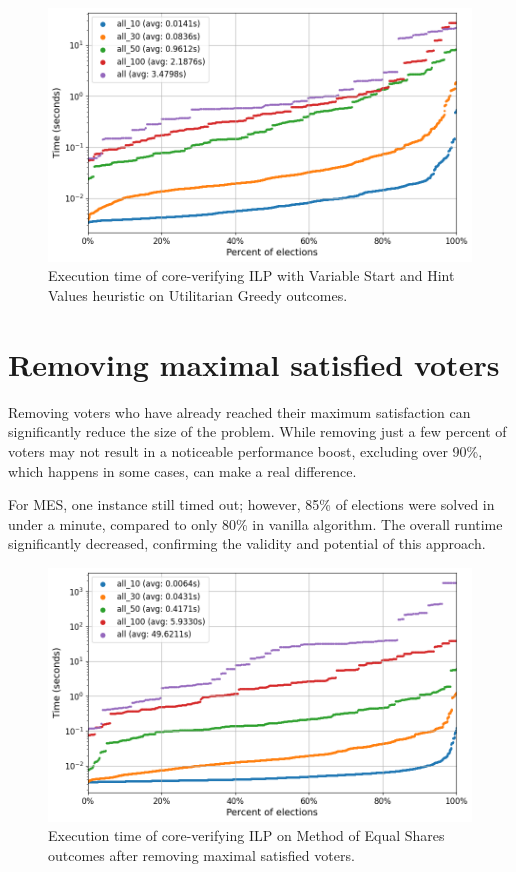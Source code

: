\documentclass[magisterska,en]{pracamgr}
\newcommand\chartsize{0.94}
\begin{document}
\begin{figure}[h!]
    \centering
    \includegraphics[width=\chartsize\linewidth]{outputs/StartandVarHintVal/greedy.png}
    \caption{Execution time of core-verifying ILP with Variable Start and Hint Values heuristic on Utilitarian Greedy outcomes.}
    \label{start-and-hint-greedy}
\end{figure}

\section{Removing maximal satisfied voters}

Removing voters who have already reached their maximum satisfaction can significantly reduce the size of the problem. While removing just a few percent of voters may not result in a noticeable performance boost, excluding over 90\%, which happens in some cases, can make a real difference.

For MES, one instance still timed out; however, 85\% of elections were solved in under a minute, compared to only 80\% in vanilla algorithm. The overall runtime significantly decreased, confirming the validity and potential of this approach.

\begin{figure}[h!]
    \centering
    \includegraphics[width=\chartsize\linewidth]{outputs/VotersRemoval/mes.png}
    \caption{Execution time of core-verifying ILP on Method of Equal Shares outcomes after removing maximal satisfied voters.}
    \label{voters-removal-mes}
\end{figure}
\end{document}
